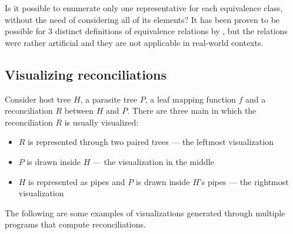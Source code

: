 \documentclass[a4paper, 12pt]{report}
\begin{document}
    Is it possible to enumerate only one representative for each equivalence class, without the need of considering all of its elements? It has been proven to be possible for 3 distinct definitions of equivalence relations by \textcite{wang}, but the relations were rather artificial and they are not applicable in real-world contexts.

    \subsection{Visualizing reconciliations}

    Consider host tree $H$, a parasite tree $P$, a leaf mapping function $f$ and a reconciliation $R$ between $H$ and $P$. There are three main  in which the reconciliation $R$ is usually visualized:


    \begin{itemize}
        \item $R$ is represented through two paired trees --- the leftmost visualization
        \item $P$ is drawn inside $H$ --- the visualization in the middle
        \item $H$ is represented as pipes and $P$ is drawn inside $H$'s pipes --- the rightmost visualization
    \end{itemize}

    \begin{example}[Visualizations]
        The following are some examples of visualizations generated through multiple programs that compute reconciliations.





    \end{example}
\end{document}

